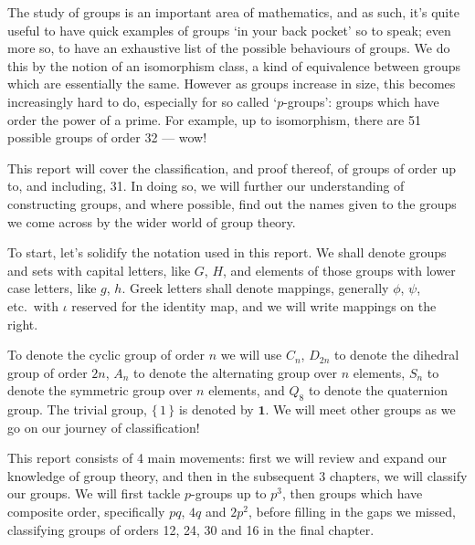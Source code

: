 The study of groups is an important area of mathematics, and as such, it's quite useful to have quick examples of groups
`in your back pocket' so to speak; even more so, to have an exhaustive list of the possible behaviours of groups.
We do this by the notion of an isomorphism class, a kind of equivalence between groups which are essentially the same.
However as groups increase in size, this becomes increasingly hard to do, especially for so called `\(p\)-groups':
groups which have order the power of a prime.
For example, up to isomorphism, there are 51 possible groups of order 32 --- wow!

This report will cover the classification, and proof thereof, of groups of order up to, and including, 31.
In doing so, we will further our understanding of constructing groups, and where possible, find out the names given to
the groups we come across by the wider world of group theory.

To start, let's solidify the notation used in this report.
We shall denote groups and sets with capital letters, like \(G\), \(H\), and elements of those groups with lower case
letters, like \(g\), \(h\).
Greek letters shall denote mappings, generally \(\phi\), \(\psi\), etc.\ with \(\iota\) reserved for the identity map,
and we will write mappings on the right.

To denote the cyclic group of order \(n\) we will use \(C_n\), \(D_{2n}\) to denote the dihedral group of order \(2n\),
\(A_n\) to denote the alternating group over \(n\) elements, \(S_n\) to denote the symmetric group over \(n\)
elements, and \(Q_8\) to denote the quaternion group.
The trivial group, \(\{\, 1\, \}\) is denoted by \(\bm{1}\).
We will meet other groups as we go on our journey of classification!

This report consists of 4 main movements: first we will review and expand our knowledge of group theory, and then in the
subsequent 3 chapters, we will classify our groups.
We will first tackle \(p\)-groups up to \(p^3\), then groups which have composite order, specifically \(pq\), \(4q\) and
\(2p^2\), before filling in the gaps we missed, classifying groups of orders 12, 24, 30 and 16 in the final chapter.

